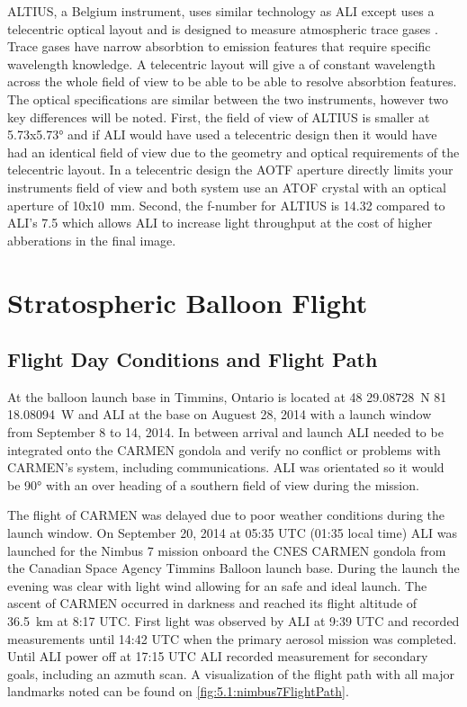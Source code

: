 \documentclass[12pt]{article}
\begin{document}
 ALTIUS, a Belgium instrument, uses similar technology as ALI except uses a telecentric optical layout and is designed to measure atmospheric trace gases \citep{Dekemper2012}. Trace gases have narrow absorbtion to emission features that require specific wavelength knowledge. A telecentric layout will give a of constant wavelength across the whole field of view to be able to be able to resolve absorbtion features. The optical specifications are similar between the two instruments, however two key differences will be noted. First, the field of view of ALTIUS is smaller at 5.73x5.73\si{\degree} and if ALI would have used a telecentric design then it would have had an identical field of view due to the geometry and optical requirements of the telecentric layout. In a telecentric design the AOTF aperture directly limits your instruments field of view and both system use an ATOF crystal with an optical aperture of 10x10~mm. Second, the f-number for ALTIUS is 14.32 compared to ALI's 7.5 which allows ALI to increase light throughput at the cost of higher abberations in the final image.

\section{Stratospheric Balloon Flight}

\subsection{Flight Day Conditions and Flight Path}

At the balloon launch base in Timmins, Ontario is located at 48 29.08728~N 81 18.08094~W and ALI at the base on Auguest 28, 2014 with a launch window from September 8 to 14, 2014. In between arrival and launch ALI needed to be integrated onto the CARMEN gondola and verify no conflict or problems with CARMEN's system, including communications. ALI was orientated so it would be 90\si{\degree} with an over heading of a southern field of view during the mission.

The flight of CARMEN was delayed due to poor weather conditions during the launch window. On September 20, 2014 at 05:35 UTC (01:35 local time) ALI was launched for the Nimbus 7 mission onboard the CNES CARMEN gondola from the Canadian Space Agency Timmins Balloon launch base. During the launch the evening was clear with light wind allowing for an safe and ideal launch. The ascent of CARMEN occurred in darkness and reached its flight altitude of 36.5~km at 8:17 UTC. First light was observed by ALI at 9:39 UTC and recorded measurements until 14:42 UTC when the primary aerosol mission was completed. Until ALI power off at 17:15 UTC ALI recorded measurement for secondary goals, including an azmuth scan. A visualization of the flight path with all major landmarks noted can be found on \autoref{fig:5.1:nimbus7FlightPath}.
\end{document}
